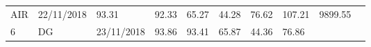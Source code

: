 \documentclass[
  11pt,
]{article}
\begin{document}
\begin{longtable}[]{@{}llllllllll@{}}
\begin{minipage}[t]{0.09\columnwidth}
AIR\strut
\end{minipage} & \begin{minipage}[t]{0.10\columnwidth}\raggedright
22/11/2018\strut
\end{minipage} & \begin{minipage}[t]{0.06\columnwidth}\raggedright
93.31\strut
\end{minipage} & \begin{minipage}[t]{0.06\columnwidth}\raggedright
92.33\strut
\end{minipage} & \begin{minipage}[t]{0.06\columnwidth}\raggedright
65.27\strut
\end{minipage} & \begin{minipage}[t]{0.06\columnwidth}\raggedright
44.28\strut
\end{minipage} & \begin{minipage}[t]{0.06\columnwidth}\raggedright
76.62\strut
\end{minipage} & \begin{minipage}[t]{0.13\columnwidth}\raggedright
107.21\strut
\end{minipage} & \begin{minipage}[t]{0.08\columnwidth}\raggedright
9899.55\strut
\end{minipage}\tabularnewline
\begin{minipage}[t]{0.04\columnwidth}\raggedright
6\strut
\end{minipage} & \begin{minipage}[t]{0.09\columnwidth}\raggedright
DG\strut
\end{minipage} & \begin{minipage}[t]{0.10\columnwidth}\raggedright
23/11/2018\strut
\end{minipage} & \begin{minipage}[t]{0.06\columnwidth}\raggedright
93.86\strut
\end{minipage} & \begin{minipage}[t]{0.06\columnwidth}\raggedright
93.41\strut
\end{minipage} & \begin{minipage}[t]{0.06\columnwidth}\raggedright
65.87\strut
\end{minipage} & \begin{minipage}[t]{0.06\columnwidth}\raggedright
44.36\strut
\end{minipage} & \begin{minipage}[t]{0.06\columnwidth}\raggedright
76.86\strut
\end{minipage} & \begin{minipage}[t]{0.13\columnwidth}\raggedright

\end{minipage}
\end{longtable}
\end{document}
